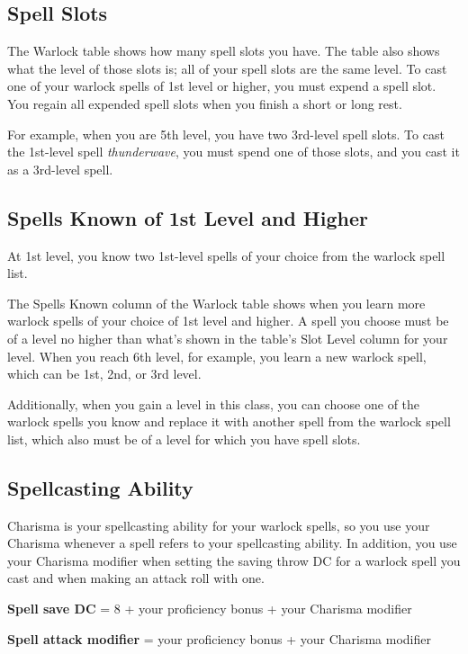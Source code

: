 \subsection{Spell Slots}

The Warlock table shows how many spell slots you have. The table also shows what the level of those slots is; all of your spell slots are the same level. To cast one of your warlock spells of 1st level or higher, you must expend a spell slot. You regain all expended spell slots when you finish a short or long rest.

For example, when you are 5th level, you have two 3rd-level spell slots. To cast the 1st-level spell \textit{thunderwave}, you must spend one of those slots, and you cast it as a 3rd-level spell.

\subsection{Spells Known of 1st Level and Higher}

At 1st level, you know two 1st-level spells of your choice from the warlock spell list.

The Spells Known column of the Warlock table shows when you learn more warlock spells of your choice of 1st level and higher. A spell you choose must be of a level no higher than what's shown in the table's Slot Level column for your level. When you reach 6th level, for example, you learn a new warlock spell, which can be 1st, 2nd, or 3rd level.

Additionally, when you gain a level in this class, you can choose one of the warlock spells you know and replace it with another spell from the warlock spell list, which also must be of a level for which you have spell slots.

\subsection{Spellcasting Ability}

Charisma is your spellcasting ability for your warlock spells, so you use your Charisma whenever a spell refers to your spellcasting ability. In addition, you use your Charisma modifier when setting the saving throw DC for a warlock spell you cast and when making an attack roll with one.

\textbf{Spell save DC} = 8 + your proficiency bonus + your Charisma modifier

\textbf{Spell attack modifier} = your proficiency bonus + your Charisma modifier

